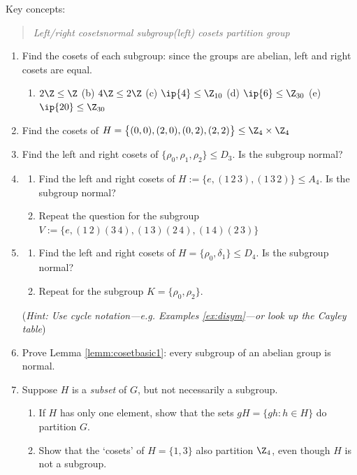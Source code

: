 \begin{exercises}{}{}
	Key concepts:
	\begin{quote}
		\emph{Left/right cosets\qquad normal subgroup\qquad (left) cosets partition group}
	\end{quote}

	\begin{enumerate}
	  \item Find the cosets of each subgroup: since the groups are abelian, left and right cosets are equal.
		\begin{enumerate}
	  	\item $2\Z\le\Z$\qquad\quad
	  	(b) $4\Z\le 2\Z$\qquad\quad
		  (c) $\ip{4}\le\Z_{10}$\qquad\quad
		  (d) $\ip{6}\le\Z_{30}$\qquad\quad
		  (e) $\ip{20}\le\Z_{30}$
		\end{enumerate}
			
			
		\item\label{exs:VfactorV} Find the cosets of $H=\bigl\{(0,0),(2,0),(0,2),(2,2)\bigr\}\le\Z_4\times\Z_4$
			
			
		\item Find the left and right cosets of $\{\rho_0,\rho_1,\rho_2\}\le D_3$. Is the subgroup normal?
		
		
		\item\label{exs:va4}\begin{enumerate}
		  \item Find the left and right cosets of $H:=\{e,(1\,2\,3),(1\,3\,2)\}\le A_4$. Is the subgroup normal?
		  \item Repeat the question for the subgroup $V:=\{e,(1\,2)(3\,4),(1\,3)(2\,4),(1\,4)(2\,3)\}$
		\end{enumerate}
		
	
		\item\label{exs:d4normal}\begin{enumerate}
		  \item Find the left and right cosets of $H=\{\rho_0,\delta_1\}\le D_4$. Is the subgroup normal?
			\item Repeat for the subgroup $K=\{\rho_0,\rho_2\}$.
		\end{enumerate}
		(\emph{Hint: Use cycle notation---e.g. Examples \ref{ex:disym}---or look up the Cayley table})
	  
	  
	  \item Prove Lemma \ref{lemm:cosetbasic1}: every subgroup of an abelian group is normal.
	  
	  
	  \item\label{exs:partitioncoset} Suppose $H$ is a \emph{subset} of $G$, but not necessarily a subgroup.
	  \begin{enumerate}
	    \item If $H$ has only one element, show that the sets $gH=\{gh:h\in H\}$ do partition $G$.
	    \item Show that the `cosets' of $H=\{1,3\}$ also partition $\Z_4$, even though $H$ is not a subgroup.
	  \end{enumerate}
	  

\end{enumerate}
\end{exercises}
